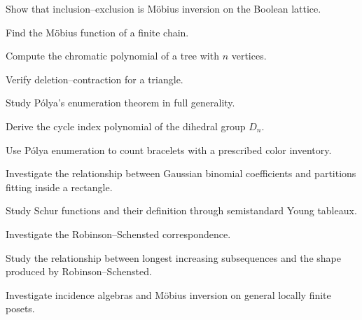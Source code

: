 \begin{exercise}[3]
Show that inclusion--exclusion is Möbius inversion on the Boolean
lattice.
\end{exercise}

\begin{exercise}[3]
Find the Möbius function of a finite chain.
\end{exercise}

\begin{exercise}[3]
Compute the chromatic polynomial of a tree with \(n\) vertices.
\end{exercise}

\begin{exercise}[3]
Verify deletion--contraction for a triangle.
\end{exercise}

\begin{exercise}[4]
Study P\'olya's enumeration theorem in full generality.
\end{exercise}

\begin{exercise}[4]
Derive the cycle index polynomial of the dihedral group \(D_n\).
\end{exercise}

\begin{exercise}[4]
Use P\'olya enumeration to count bracelets with a prescribed color
inventory.
\end{exercise}

\begin{exercise}[4]
Investigate the relationship between Gaussian binomial coefficients and
partitions fitting inside a rectangle.
\end{exercise}

\begin{exercise}[4]
Study Schur functions and their definition through semistandard Young
tableaux.
\end{exercise}

\begin{exercise}[4]
Investigate the Robinson--Schensted correspondence.
\end{exercise}

\begin{exercise}[4]
Study the relationship between longest increasing subsequences and the
shape produced by Robinson--Schensted.
\end{exercise}

\begin{exercise}[4]
Investigate incidence algebras and Möbius inversion on general locally
finite posets.
\end{exercise}

